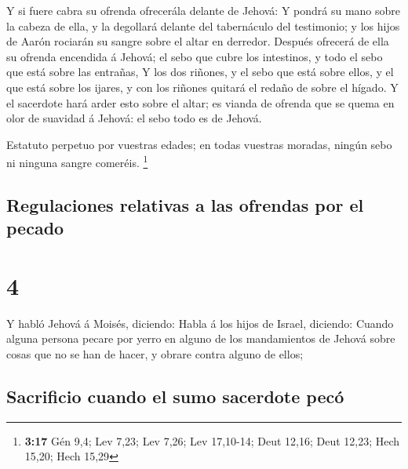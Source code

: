  Y si fuere cabra su ofrenda ofrecerála delante de
Jehová:  Y pondrá su mano sobre la cabeza de ella, y la
degollará delante del tabernáculo del testimonio; y los hijos de Aarón
rociarán su sangre sobre el altar en derredor.  Después
ofrecerá de ella su ofrenda encendida á Jehová; el sebo que cubre los
intestinos, y todo el sebo que está sobre las entrañas, 
Y los dos riñones, y el sebo que está sobre ellos, y el que está sobre
los ijares, y con los riñones quitará el redaño de sobre el hígado.
 Y el sacerdote hará arder esto sobre el altar; es vianda
de ofrenda que se quema en olor de suavidad á Jehová: el sebo todo es de
Jehová.

 Estatuto perpetuo por vuestras edades; en todas vuestras
moradas, ningún sebo ni ninguna sangre comeréis. \footnote{\textbf{3:17}
  Gén 9,4; Lev 7,23; Lev 7,26; Lev 17,10-14; Deut 12,16; Deut 12,23;
  Hech 15,20; Hech 15,29}

\hypertarget{regulaciones-relativas-a-las-ofrendas-por-el-pecado}{%
\subsection{Regulaciones relativas a las ofrendas por el
pecado}\label{regulaciones-relativas-a-las-ofrendas-por-el-pecado}}

\hypertarget{section-3}{%
\section{4}\label{section-3}}

 Y habló Jehová á Moisés, diciendo:  Habla á
los hijos de Israel, diciendo: Cuando alguna persona pecare por yerro en
alguno de los mandamientos de Jehová sobre cosas que no se han de hacer,
y obrare contra alguno de ellos;

\hypertarget{sacrificio-cuando-el-sumo-sacerdote-pecuxf3}{%
\subsection{Sacrificio cuando el sumo sacerdote
pecó}\label{sacrificio-cuando-el-sumo-sacerdote-pecuxf3}}

